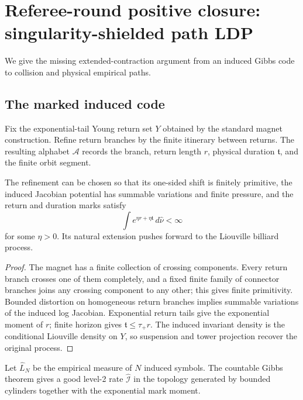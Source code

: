 \section{Referee-round positive closure: singularity-shielded path LDP}
\label{sec:rr2-a3}

We give the missing extended-contraction argument from an induced Gibbs code
to collision and physical empirical paths.

\subsection{The marked induced code}

Fix the exponential-tail Young return set \(Y\) obtained by the standard
magnet construction.  Refine return branches by the finite itinerary between
returns.  The resulting alphabet \(\mathcal A\) records the branch, return
length \(r\), physical duration \(\mathfrak t\), and the finite orbit segment.

\begin{lemma}
\label{lem:rr2-a3-code}
The refinement can be chosen so that its one-sided shift is finitely
primitive, the induced Jacobian potential has summable variations and finite
pressure, and the return and duration marks satisfy
\[
 \int e^{\eta r+\eta\mathfrak t}\,d\widehat\nu<\infty
\]
for some \(\eta>0\).  Its natural extension pushes forward to the Liouville
billiard process.
\end{lemma}

\begin{proof}
The magnet has a finite collection of crossing components.  Every return
branch crosses one of them completely, and a fixed finite family of connector
branches joins any crossing component to any other; this gives finite
primitivity.  Bounded distortion on homogeneous return branches implies
summable variations of the induced log Jacobian.  Exponential return tails
give the exponential moment of \(r\); finite horizon gives
\(\mathfrak t\le\tau_+r\).  The induced invariant density is the conditional
Liouville density on \(Y\), so suspension and tower projection recover the
original process.
\end{proof}

Let \(\widehat L_N\) be the empirical measure of \(N\) induced symbols.  The
countable Gibbs theorem gives a good level-2 rate
\(\widehat{\mathcal I}\) in the topology generated by bounded cylinders
together with the exponential mark moment.

